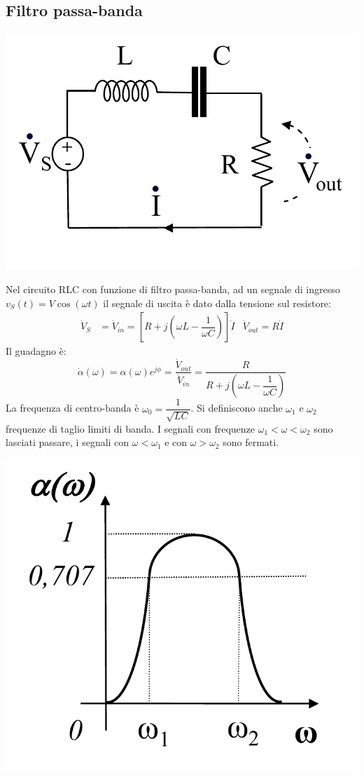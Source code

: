 \documentclass{article}
\begin{document}
\subsection{Filtro passa-banda}
\begin{center}
    \includegraphics[scale=0.3]{Image/Passa-banda_1.png}
\end{center}
Nel circuito RLC con funzione di filtro passa-banda, ad un segnale di ingresso $v_S(t) = V \cos (\omega t)$ il segnale di uscita è dato dalla tensione sul resistore:
\begin{align*}
    \dot V_S &= \dot V_{in} = \left[R + j\left(\omega L - \dfrac{1}{\omega C}\right)\right] \dot I & \dot V_{out} = R \dot I
\end{align*}
Il guadagno è:
\[\dot \alpha(\omega)=\alpha(\omega) e^{j \phi}=\frac{\dot V_{out}}{\dot V_{in}}=\frac{R}{R + j\left(\omega L - \dfrac{1}{\omega C}\right)}\]
La frequenza di centro-banda è $\omega_0= \dfrac{1}{\sqrt{LC}}$. Si definiscono anche $\omega_1$ e $\omega_2$ frequenze di taglio limiti di banda. I segnali con frequenze $\omega_1<\omega<\omega_2$ sono lasciati passare, i segnali con $\omega < \omega_1$ e con $\omega > \omega_2$ sono fermati.
\begin{center}
    \includegraphics[scale=0.27]{Image/Passa-banda_2.png}
\end{center}
\end{document}
